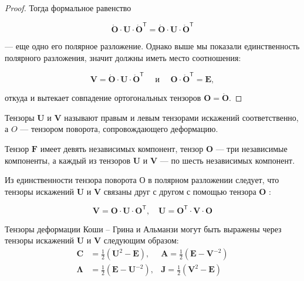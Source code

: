 \begin{proof}
Тогда формальное равенство

\[
\mathring{\mathbf{O}} \cdot \mathbf{U} \cdot \mathring{\mathbf{O}}^{\mathsf{T}}=\mathring{\mathbf{O}} \cdot \mathbf{U} \cdot \mathring{\mathbf{O}}^{\mathsf{T}}
\]

--- еще одно его полярное разложение. Однако выше мы показали единственность полярного разложения, значит должны иметь место соотношения:

\[
\mathbf{V}=\mathring{\mathbf{O}} \cdot \mathbf{U} \cdot \mathring{\mathbf{O}}^{\mathsf{T}} \quad \text { и } \quad \mathbf{O} \cdot \mathring{\mathbf{O}}^{\mathsf{T}}=\mathbf{E},
\]

откуда и вытекает совпадение ортогональных тензоров $\mathbf{O}=\mathring{\mathbf{O}}$.
\end{proof}

Тензоры $\mathbf{U}$ и $\mathbf{V}$ называют правым и левым тензорами искажений
соответственно, а $ O $ --- тензором поворота, сопровождающего деформацию.

Тензор $\mathbf{F}$ имеет девять независимых компонент, тензор $\mathbf{O}$ ---
три независимые компоненты, а каждый из тензоров $\mathbf{U}$ и $\mathbf{V}$ ---
по шесть независимых компонент.

Из единственности тензора поворота О в полярном разложении
следует, что тензоры искажений $\mathbf{U}$ и $\mathbf{V}$ связаны друг с другом
с помощью тензора $\mathbf{O}$ :

\[
\mathbf{V}=\mathbf{O} \cdot \mathbf{U} \cdot \mathbf{O}^{\mathsf{T}}, \quad \mathbf{U}=\mathbf{O}^{\mathsf{T}} \cdot \mathbf{V} \cdot \mathbf{O}
\]

Тензоры деформации Коши -- Грина и Альманзи могут быть выражены через тензоры
искажений $\mathbf{U}$ и $ \mathbf{V} $ следующим образом: 
\[
\begin{aligned}
\mathbf{C} & =\frac{1}{2}\left(\mathbf{U}^{2}-\mathbf{E}\right), &
\mathbf{A}=\frac{1}{2}\left(\mathbf{E}-\mathbf{V}^{-2}\right) \\
\boldsymbol{\Lambda} & =\frac{1}{2}\left(\mathbf{E}-\mathbf{U}^{-2}\right), &
\mathbf{J}=\frac{1}{2}\left(\mathbf{V}^{2}-\mathbf{E}\right)
\end{aligned}
\]

